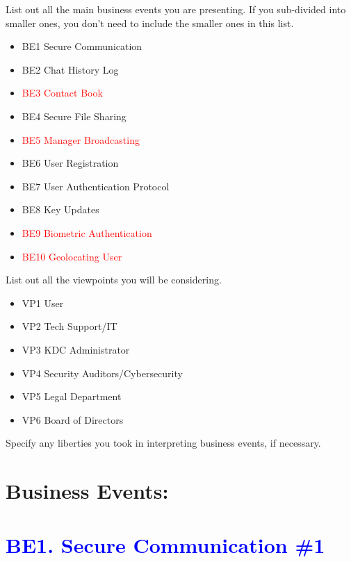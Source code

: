 \documentclass[]{article}
\begin{document}
 List out all the main business events you are presenting. If you sub-divided into smaller ones, you don't need to include the smaller ones in this list.\\

\begin{itemize}
	\item BE1 Secure Communication
	\item BE2 Chat History Log
	\item[\textcolor{red}{\textbullet}] \textcolor{red}{BE3 Contact Book}
	\item BE4 Secure File Sharing
	\item[\textcolor{red}{\textbullet}] \textcolor{red}{BE5 Manager Broadcasting}
	\item BE6 User Registration
	\item BE7 User Authentication Protocol
	\item BE8 Key Updates
	\item[\textcolor{red}{\textbullet}] \textcolor{red}{BE9 Biometric Authentication}
	\item[\textcolor{red}{\textbullet}] \textcolor{red}{BE10 Geolocating User}

\end{itemize}

 List out all the viewpoints you will be considering.\\

\begin{itemize}
	\item VP1 User
	\item 	VP2 Tech Support/IT
	\item 	VP3 KDC Administrator
	\item 	VP4 Security Auditors/Cybersecurity
	\item 	VP5 Legal Department
	\item 	VP6 Board of Directors


\end{itemize}

 Specify any liberties you took in interpreting business events, if necessary.\\

\section*{Business Events:}
\section*{\textcolor{blue}{BE1. Secure Communication \#1}}
\end{document}

